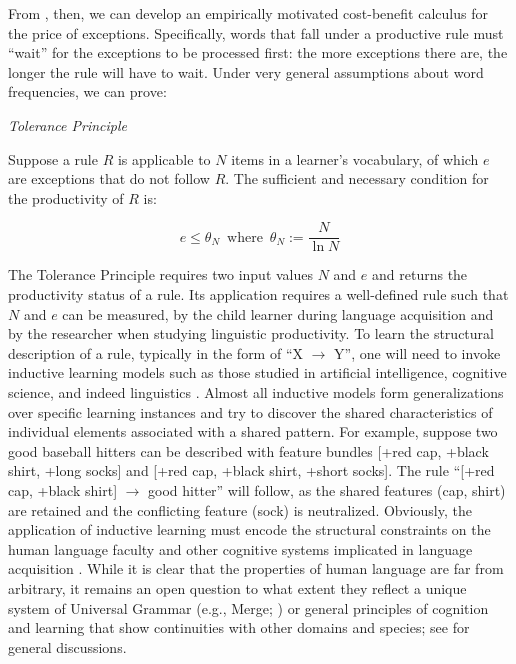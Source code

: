\documentclass[output=paper,
modfonts
]{LSP/langsci}
\begin{document}
From , then, we can develop  an empirically motivated
cost-benefit calculus for the price of exceptions.  Specifically, 
words that fall under a productive rule must ``wait'' for the
exceptions to be processed first: the
more exceptions there are, the longer the rule will have to wait.
Under very general assumptions about word frequencies, we can prove:

\begin{exe} \ex \label{TP}
\textit{Tolerance Principle} 

Suppose a rule  $R$ is applicable to $N$ items in a learner's
vocabulary, of which $e$ are exceptions that do not follow $R$. The
sufficient and necessary condition for the productivity of $R$ is:  

\[ e \leq \theta_N\,\,\,\mbox{where}\,\,\, \theta_N := \frac{N}{\ln N} \]

\end{exe}
The Tolerance Principle  requires two input values
$N$ and $e$ and returns the productivity status of a rule.  Its
application  requires a well-defined rule such that $N$ and $e$ can be
measured, by the child learner during language acquisition and by the
researcher when studying linguistic productivity. To learn the 
structural description of a rule, typically in the form of ``X
$\longrightarrow$ Y'', one will need to invoke  inductive learning
models such as  those studied in artificial intelligence, cognitive
science, and indeed linguistics \citep[e.g.,][]{LSLT}. Almost all inductive
models  form generalizations over specific learning instances and try
to discover the  shared characteristics of individual elements associated with a shared
pattern.  For example, suppose two good baseball hitters can be
described with feature bundles  [+red cap, +black shirt, +long socks]
and [+red cap, +black shirt, +short socks]. The rule 
``[+red cap, +black shirt] 
$\longrightarrow$ good hitter'' will follow, as the shared features
(cap, shirt) are retained and the conflicting feature (sock) is
neutralized. Obviously, the application of inductive learning 
 must  encode the structural constraints on
the human language faculty and other cognitive systems  implicated
in language acquisition \citep{ASPECTS}. While it is clear that the
properties  of human language are far from arbitrary, it
remains an open question to what extent they reflect a
unique system of Universal Grammar (e.g., Merge;
\citealt{Berwick2016}) or  general principles of  cognition and 
learning that  show continuities with other domains and species;
see \citealt{Yang2004, Chomsky2005, Yang2017} for general discussions.  
\end{document}
